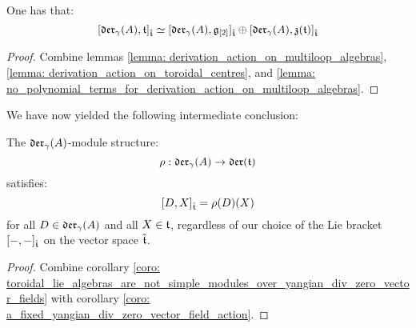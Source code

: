         \begin{corollary} \label{coro: toroidal_lie_algebras_are_not_simple_modules_over_yangian_div_zero_vector_fields}
            One has that:
                $$[\mathfrak{der}_{\gamma}(A), \mathfrak{t}]_{\hat{\mathfrak{t}}} \simeq [\mathfrak{der}_{\gamma}(A), \mathfrak{g}_{[2]}]_{\hat{\mathfrak{t}}} \oplus [\mathfrak{der}_{\gamma}(A), \mathfrak{z}(\mathfrak{t})]_{\hat{\mathfrak{t}}}$$
        \end{corollary}
            \begin{proof}
                Combine lemmas \ref{lemma: derivation_action_on_multiloop_algebras}, \ref{lemma: derivation_action_on_toroidal_centres}, and \ref{lemma: no_polynomial_terms_for_derivation_action_on_multiloop_algebras}.
            \end{proof}

        We have now yielded the following intermediate conclusion:
        \begin{proposition} \label{prop: toroidal_lie_algebras_as_modules_over_div_zero_vector_field_lie_algebras}
            The $\mathfrak{der}_{\gamma}(A)$-module structure:
                $$\rho: \mathfrak{der}_{\gamma}(A) \to \mathfrak{der}(\mathfrak{t})$$
            satisfies:
                $$[D, X]_{\hat{\mathfrak{t}}} = \rho(D)(X)$$
            for all $D \in \mathfrak{der}_{\gamma}(A)$ and all $X \in \mathfrak{t}$, regardless of our choice of the Lie bracket $[-, -]_{\hat{\mathfrak{t}}}$ on the vector space $\hat{\mathfrak{t}}$.
        \end{proposition}
            \begin{proof}
                Combine corollary \ref{coro: toroidal_lie_algebras_are_not_simple_modules_over_yangian_div_zero_vector_fields} with corollary \ref{coro: a_fixed_yangian_div_zero_vector_field_action}.
            \end{proof}
            
